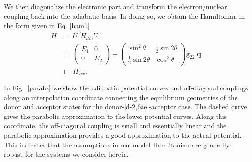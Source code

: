 We then diagonalize the electronic part and transform the electron/nuclear coupling
back into the adiabatic basis.  In doing so,  we obtain the Hamiltonian in the
form given in Eq. \ref{ham1}
\begin{eqnarray}
H&=&U^{T}H_{dia}U\nonumber  \\
&=&\left(\begin{array}{cc}
E_{1}  & 0 \\
0 & E_{2}
\end{array}\right)+\left(\begin{array}{cc}
\sin^{2}\theta & \frac{1}{2}\sin2\theta\\
\frac{1}{2}\sin2\theta & \cos^{2}\theta
\end{array}\right) {\mathbf g}_{22}.{\mathbf q} \nonumber \\
&+& H_{osc}.\label{eq:locaiHam}
\end{eqnarray}


In Fig.~\ref{parabs} we show the adiabatic potential curves and off-diagonal couplings along an interpolation coordinate
connecting the equilibrium geometries of the donor and acceptor states for the donor-[d-2,6ae]-acceptor case.
The dashed curve gives the parabolic approximation to the
lower potential curves.  Along this coordinate, the off-diagonal coupling is small and essentially linear and the parabolic
approximation provides a good approximation to the actual potential.  This indicates that the assumptions in our model Hamiltonian
are generally robust for the systems we consider herein.

